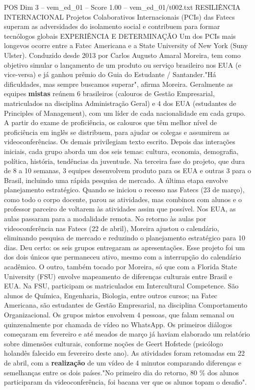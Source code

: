 \begin{textsample}{POS Dim 3 – vem\_ed\_01 – Score 1.00 – vem\_ed\_01/t002.txt}  \label{ex:f3_pos_120}
RESILIÊNCIA INTERNACIONAL Projetos Colaborativos Internacionais (PCIs) das Fatecs superam as adversidades do isolamento social e contribuem para formar tecnólogos globais EXPERIÊNCIA E DETERMINAÇÃO Um dos PCIs mais longevos ocorre entre a Fatec Americana e a State University of New York (Suny Ulster).
Conduzido desde 2013 por Carlos Augusto Amaral Moreira, tem como objetivo simular o lançamento de um produto ou serviço brasileiro nos EUA (e vice-versa) e já ganhou prêmio do Guia do Estudante / Santander."Há dificuldades, mas sempre buscamos superar", afirma Moreira.
Geralmente as equipes \textbf{mistas} reúnem 6 brasileiros (calouros de Gestão Empresarial, matriculados na disciplina Administração Geral) e 4 dos EUA (estudantes de Principles of Management), com um líder de cada nacionalidade em cada grupo.
A partir do exame de proficiência, os calouros que têm melhor nível de proficiência em inglês se distribuem, para ajudar os colegas e assumirem as videoconferências.
Os demais privilegiam texto escrito.
Depois das interações iniciais, cada grupo aborda um dos seis temas: cultura, economia, demografia, política, história, tendências da juventude.
Na terceira fase do projeto, que dura de 8 a 10 semanas, 3 equipes desenvolvem produto para os EUA e outras 3 para o Brasil, incluindo uma rápida pesquisa de mercado.
A última etapa envolve planejamento estratégico.
Quando se iniciou o recesso nas Fatecs (23 de março), como todo o corpo docente, parou as atividades, mas combinou com alunos e o professor parceiro de voltarem às atividades assim que possível.
Nos EUA, as aulas passaram para a modalidade remota.
No retorno às aulas por videoconferência nas Fatecs (22 de abril), Moreira ajustou o calendário, eliminando pesquisa de mercado e reduzindo o planejamento estratégico para 10 dias.
Deu certo: os seis grupos entregaram as apresentações.
Esse projeto foi um dos dois únicos que permaneceu ativo, mesmo com a interrupção do calendário acadêmico.
O outro, também tocado por Moreira, só que com a Florida State University (FSU) envolve mapeamento de diferenças culturais entre Brasil e EUA.
Na FSU, participam os matriculados em Intercultural Competence.
São alunos de Química, Engenharia, Biologia, entre outros cursos; na Fatec Americana, são estudantes de Gestão Empresarial, na disciplina Comportamento Organizacional.
Os grupos mistos envolvem 4 pessoas, que falam semanal ou quinzenalmente por chamada de vídeo no WhatsApp.
Os primeiros diálogos começaram em fevereiro e até meados de março já haviam elaborado um relatório sobre dimensões culturais, conforme noções de Geert Hofstede (psicólogo holandês falecido em fevereiro deste ano).
As atividades foram retomadas em 22 de abril, com a \textbf{realização} de um vídeo de 4 minutos comparando diferenças e semelhanças entre os dois países."No primeiro dia do retorno, 80 \% dos alunos participaram da videoconferência, foi bacana ver que os alunos topam o desafio".

\end{textsample}
